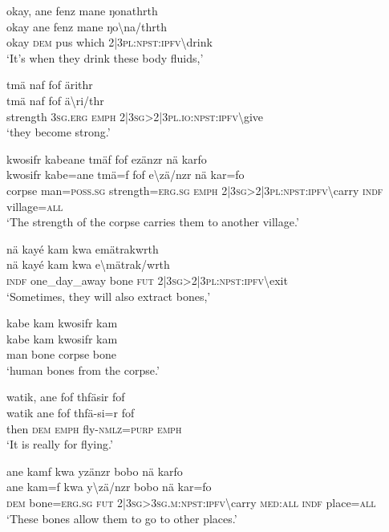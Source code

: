 \ea\label{ex:a4379}
okay, ane fenz mane ŋonathrth\\
\gll okay	ane	fenz	mane	ŋo{\textbackslash}na/thrth\\
     okay	\textsc{dem}	pus	which	2|3\textsc{pl}:\textsc{npst}:\textsc{ipfv}{\textbackslash}drink\\
\glt `It's when they drink these body fluids,'
\z

\ea\label{ex:a4380}
tmä naf fof ärithr\\
\gll tmä	naf	fof	ä{\textbackslash}ri/thr\\
     strength	3\textsc{sg}.\textsc{erg}	\textsc{emph}	2|3\textsc{sg}>2|3\textsc{pl}.\textsc{io}:\textsc{npst}:\textsc{ipfv}{\textbackslash}give\\
\glt `they become strong.'
\z

\ea\label{ex:a4381}
kwosifr kabeane tmäf fof ezänzr nä karfo\\
\gll kwosifr	kabe=ane	tmä=f	fof	e{\textbackslash}zä/nzr	nä	kar=fo\\
     corpse	man=\textsc{poss}.\textsc{sg}	strength=\textsc{erg}.\textsc{sg}	\textsc{emph}	2|3\textsc{sg}>2|3\textsc{pl}:\textsc{npst}:\textsc{ipfv}{\textbackslash}carry	\textsc{indf}	village=\textsc{all}\\
\glt `The strength of the corpse carries them to another village.'
\z

\ea\label{ex:a4383}
nä kayé kam kwa emätrakwrth\\
\gll nä	kayé	kam	kwa	e{\textbackslash}mätrak/wrth\\
     \textsc{indf}	one\_day\_away	bone	\textsc{fut}	2|3\textsc{sg}>2|3\textsc{pl}:\textsc{npst}:\textsc{ipfv}{\textbackslash}exit\\
\glt `Sometimes, they will also extract bones,'
\z

\ea\label{ex:a4384}
kabe kam kwosifr kam\\
\gll kabe	kam	kwosifr	kam\\
     man	bone	corpse	bone\\
\glt `human bones from the corpse.'
\z

\ea\label{ex:a4386}
watik, ane fof thfäsir fof\\
\gll watik	ane	fof	thfä-si=r	fof\\
     then	\textsc{dem}	\textsc{emph}	fly-\textsc{nmlz}=\textsc{purp}	\textsc{emph}\\
\glt `It is really for flying.'
\z

\ea\label{ex:a4387}
ane kamf kwa yzänzr bobo nä karfo\\
\gll ane	kam=f	kwa	y{\textbackslash}zä/nzr	bobo	nä	kar=fo\\
     \textsc{dem}	bone=\textsc{erg}.\textsc{sg}	\textsc{fut}	2|3\textsc{sg}>3\textsc{sg}.\textsc{m}:\textsc{npst}:\textsc{ipfv}{\textbackslash}carry	\textsc{med}:\textsc{all}	\textsc{indf}	place=\textsc{all}\\
\glt `These bones allow them to go to other places.'
\z

